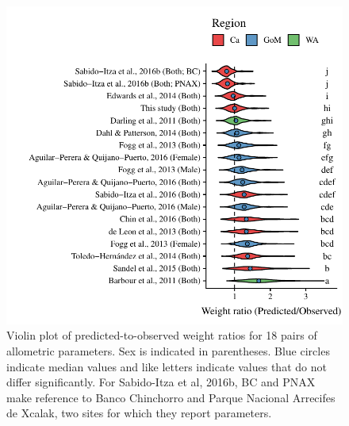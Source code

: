 \documentclass[fleqn,10pt,lineno]{wlpeerj} %
\begin{document}
\begin{figure}
\centering
\includegraphics{Manuscript_files/figure-latex/pred_obs-1.pdf}
\caption{\label{fig:bio_ratio}Violin plot of predicted-to-observed
weight ratios for 18 pairs of allometric parameters. Sex is indicated in
parentheses. Blue circles indicate median values and like letters
indicate values that do not differ significantly. For Sabido-Itza et al,
2016b, BC and PNAX make reference to Banco Chinchorro and Parque
Nacional Arrecifes de Xcalak, two sites for which they report
parameters.}
\end{figure}
\end{document}
